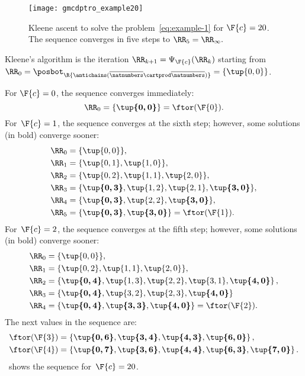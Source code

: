 \begin{figure}
    \begin{centering}
        \texttt{[image: gmcdptro\_example20]}
    \end{centering}
    \caption{Kleene ascent to solve the problem~\cref{eq:example-1} for $\F{c}=20$.
        The sequence converges in five steps to $\RR_{5}=\RR_{\infty}.
        $ }
    \label{fig:example24}
\end{figure}

\noindent Kleene's algorithm is the iteration $\RR_{k+1}=\Psi_{\F{c}}(\RR_{k})$
starting from $\RR_{0}=\posbot_{\R{\antichains(\overline{\natnumbers}\cartprod\overline{\natnumbers})}}=\{\tup{ 0,0} \}$.

\noindent For $\F{c}=0$, the sequence converges immediately:
\begin{equation*}
    \RR_{0}=\{\boldsymbol{\tup{ 0,0} }\}=\ftor(\F{0}).
\end{equation*}
For~$\F{c}=1$, the sequence converges at the sixth step; however, some solutions (in bold) converge sooner:
\begin{align*}
    \RR_{0} & =\{\tup{0,0} \}, \\
    \RR_{1} & =\{\tup{0,1},\tup{1,0}\}, \\
    \RR_{2} & =\{\tup{0,2},\tup{1,1}, \tup{2,0}\}, \\
    \RR_{3} & =\{\boldsymbol{\tup{0,3}},\tup{1,2}, \tup{2,1},\boldsymbol{\tup{3,0}}\}, \\
    \RR_{4} & =\{\boldsymbol{\tup{0,3}},\tup{2,2},\boldsymbol{\tup{3,0}}\}, \\
    \RR_{5} & =\{\boldsymbol{\tup{0,3}},\boldsymbol{\tup{3,0}}\}=\ftor(\F{1}).
\end{align*}
For~$\F{c}=2$, the sequence converges at the fifth step; however,
some solutions (in bold) converge sooner:
\begin{align*}
    \RR_{0} & =\{\tup{ 0,0} \}, \\
    \RR_{1} & =\{\tup{ 0,2} ,\tup{ 1,1} ,\tup{ 2,0} \}, \\
    \RR_{2} & =\left\{ \boldsymbol{\tup{ 0,4} }, \tup{1,3}, \tup{2,2}, \tup{3,1}, \boldsymbol{\tup{ 4,0} }\right\} , \\
    \RR_{3} & =\{\boldsymbol{\tup{0,4} },\tup{ 3,2}, \tup{2,3}, \boldsymbol{\tup{ 4,0} }\} \\
    \RR_{4} & =\{\boldsymbol{\tup{0,4} },\boldsymbol{\tup{ 3,3}},\boldsymbol{\tup{ 4,0} }\}=\ftor(\F{2}).
\end{align*}
The next values in the sequence are:
\begin{align*}
    \ftor(\F{3}) & =\left\{ \boldsymbol{\tup{ 0,6} },\boldsymbol{\tup{ 3,4} },\boldsymbol{\tup{ 4,3} },\boldsymbol{\tup{ 6,0} }\right\} , \\
    \ftor(\F{4}) & =\left\{ \boldsymbol{\tup{ 0,7} },\boldsymbol{\tup{ 3,6} },\boldsymbol{\tup{ 4,4} },\boldsymbol{\tup{ 6,3} },\boldsymbol{\tup{ 7,0} }\right\} .
\end{align*}
~shows the sequence for~$\F{c}=20$.

